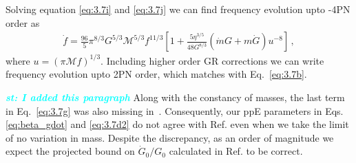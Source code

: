 \documentclass[prd,twocolumn,nofootinbib]{revtex4-1}
\newcommand{\st}[1]{\textcolor{cyan}{\it{\textbf{st: #1}}} }
\begin{document}
Solving equation \eqref{eq:3.7i} and \eqref{eq:3.7j} we can find frequency evolution upto -4PN order as
 \begin{align} 
 \dot{f}=\frac{96}{5}\pi^{8/3}G^{5/3}\mathcal{M}^{5/3}f^{11/3}[1+\frac{5\eta^{3/5}}{48 G^{8/3}}(\dot{m}G+m\dot{G})u^{-8}]\,,
 \end{align} 
where $u=(\pi \mathcal{M}f)^{1/3}$. Including higher order GR corrections we can write frequency evolution upto 2PN order, which matches with Eq.~\eqref{eq:3.7b}.

\st{I added this paragraph}
Along with the constancy of masses, the last term in Eq.~\eqref{eq:3.7g} was also missing in~\cite{Yunes:2009bv}. Consequently, our ppE parameters in Eqs. \eqref{eq:beta_gdot} and \eqref{eq:3.7d2} do not agree with Ref. \cite{Yunes:2009bv} even when we take the limit of no variation in mass. Despite the discrepancy, as an order of magnitude we expect the projected bound on $\dot{G}_0/G_0$ calculated in Ref. \cite{Yunes:2009bv} to be correct.

%
%

\end{document}

